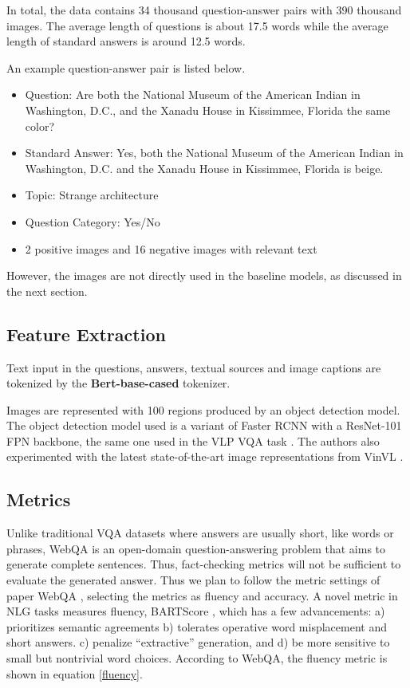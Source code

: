 \documentclass[nohyperref]{article}
\theoremstyle{plain}
\theoremstyle{definition}
\theoremstyle{remark}
\begin{document}
    In total, the data contains 34 thousand question-answer pairs with 390 thousand images.
    The average length of questions is about 17.5 words while the average length of standard answers is around 12.5 words.

    An example question-answer pair is listed below.
    \begin{itemize}
        \item Question: Are both the National Museum of the American Indian in Washington, D.C., and the Xanadu House
        in Kissimmee, Florida the same color?
        \item Standard Answer: Yes, both the National Museum of the American Indian in Washington, D.C. and the Xanadu
        House in Kissimmee, Florida is beige.
        \item Topic: Strange architecture
        \item Question Category: Yes/No
        \item 2 positive images and 16 negative images with relevant text
    \end{itemize}

    However, the images are not directly used in the baseline models, as discussed in the next section.

    \subsection{Feature Extraction}

    Text input in the questions, answers, textual sources and image captions are tokenized by the \textbf{Bert-base-cased} \cite{bert} tokenizer.

    Images are represented with 100 regions produced by an object detection model.
    The object detection model used is a variant of Faster RCNN with a ResNet-101 FPN backbone, the same one used in
    the VLP VQA task \cite{vlp}.
    The authors also experimented with the latest state-of-the-art image representations from VinVL \cite{VinVL}.

    \subsection{Metrics}

    Unlike traditional VQA \cite{antol2015vqa} datasets where answers are usually short, like words or phrases, WebQA is an open-domain question-answering problem that aims to generate complete sentences. Thus, fact-checking metrics will not be sufficient to evaluate the generated answer. Thus we plan to follow the metric settings of paper WebQA \cite{webqa}, selecting the metrics as fluency and accuracy. A novel metric in NLG tasks measures fluency, BARTScore \cite{yuan2021bartscore}, which has a few advancements: a) prioritizes semantic agreements b) tolerates operative word misplacement and short answers. c) penalize “extractive” generation, and d) be more sensitive to small but nontrivial word choices. According to WebQA, the fluency metric is shown in equation \ref{fluency}.
\end{document}
